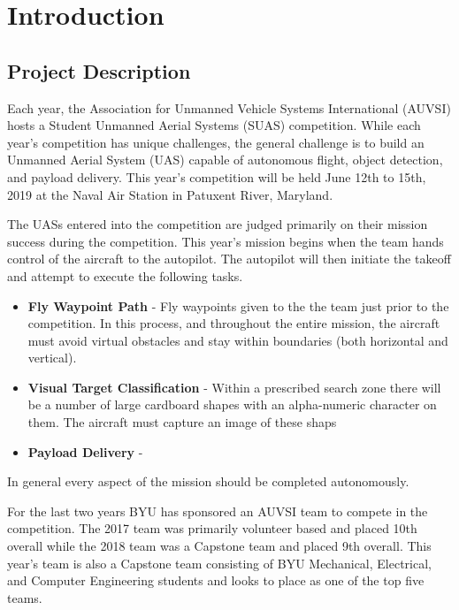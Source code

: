 \documentclass[]{auvsi_doc}
\begin{document}
\begin{AUVSITitlePage}
\begin{artifacttable} 
\end{artifacttable}
\end{AUVSITitlePage}

\section{Introduction}
\subsection{Project Description}
Each year, the Association for Unmanned Vehicle Systems International (AUVSI) hosts a Student Unmanned Aerial Systems (SUAS) competition. While each year’s competition has unique challenges, the general challenge is to build an Unmanned Aerial System (UAS) capable of autonomous flight, object detection, and payload delivery. This year’s competition will be held June 12th to 15th, 2019 at the Naval Air Station in Patuxent River, Maryland.

The UASs entered into the competition are judged primarily on their mission success during the competition. This year's mission begins when the team hands control of the aircraft to the autopilot. The autopilot will then initiate the takeoff and attempt to execute the following tasks.

\begin{itemize}
	\item\textbf{Fly Waypoint Path} - Fly waypoints given to the the team just prior to the competition. In this process, and throughout the entire mission, the aircraft must avoid virtual obstacles and stay within boundaries (both horizontal and vertical).
	\item\textbf{Visual Target Classification} - Within a prescribed search zone there will be a number of large cardboard shapes with an alpha-numeric character on them. The aircraft must capture an image of these shaps 
	\item\textbf{Payload Delivery} - 
\end{itemize}

In general every aspect of the mission should be completed autonomously. 

For the last two years BYU has sponsored an AUVSI team to compete in the competition. The 2017 team was primarily volunteer based and placed 10th overall while the 2018 team was a Capstone team and placed 9th overall. This year’s team is also a Capstone team consisting of BYU Mechanical, Electrical, and Computer Engineering students and looks to place as one of the top five teams.
\end{document}
